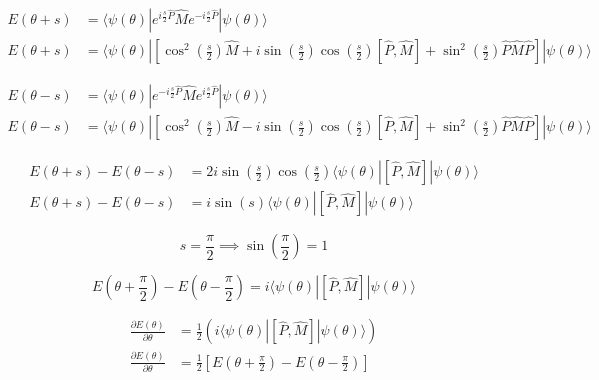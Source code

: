 \begin{align}
    E(\theta + s) &= \langle \psi(\theta) | e^{i \frac{s}{2} \hat{P}} \hat{M} e^{-i \frac{s}{2} \hat{P}} | \psi(\theta) \rangle \\
    E(\theta + s) &= \langle \psi(\theta) | \left[ \cos^2\left(\frac{s}{2}\right) \hat{M} + i \sin\left(\frac{s}{2}\right)\cos\left(\frac{s}{2}\right) [\hat{P}, \hat{M}] + \sin^2\left(\frac{s}{2}\right) \hat{P} \hat{M} \hat{P} \right] | \psi(\theta) \rangle
\end{align}

\begin{align}
    E(\theta - s) &= \langle \psi(\theta) | e^{-i \frac{s}{2} \hat{P}} \hat{M} e^{i \frac{s}{2} \hat{P}} | \psi(\theta) \rangle \\
    E(\theta - s) &= \langle \psi(\theta) | \left[ \cos^2\left(\frac{s}{2}\right) \hat{M} - i \sin\left(\frac{s}{2}\right)\cos\left(\frac{s}{2}\right) [\hat{P}, \hat{M}] + \sin^2\left(\frac{s}{2}\right) \hat{P} \hat{M} \hat{P} \right] | \psi(\theta) \rangle
\end{align}

\begin{align}
    E(\theta + s) - E(\theta - s) &= 2i \sin\left(\frac{s}{2}\right)\cos\left(\frac{s}{2}\right) \langle \psi(\theta) | [\hat{P}, \hat{M}] | \psi(\theta) \rangle \\
    E(\theta + s) - E(\theta - s) &= i \sin(s) \langle \psi(\theta) | [\hat{P}, \hat{M}] | \psi(\theta) \rangle
\end{align}

\begin{equation}
    s = \frac{\pi}{2} \implies \sin\left(\frac{\pi}{2}\right) = 1
\end{equation}

\begin{equation}
    E\left(\theta + \frac{\pi}{2}\right) - E\left(\theta - \frac{\pi}{2}\right) = i \langle \psi(\theta) | [\hat{P}, \hat{M}] | \psi(\theta) \rangle
\end{equation}

\begin{align}
    \frac{\partial E(\theta)}{\partial \theta} &= \frac{1}{2} \left( i \langle \psi(\theta) | [\hat{P}, \hat{M}] | \psi(\theta) \rangle \right) \\
    \frac{\partial E(\theta)}{\partial \theta} &= \frac{1}{2} \left[ E\left(\theta + \frac{\pi}{2}\right) - E\left(\theta - \frac{\pi}{2}\right) \right]
\end{align}

